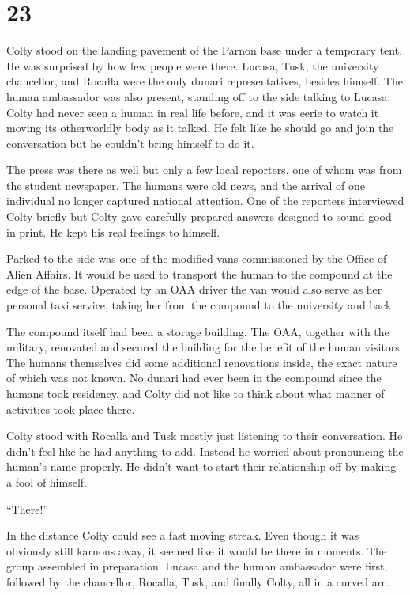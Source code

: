
\chapter{23}

Colty stood on the landing pavement of the Parnon base under a temporary tent. He was surprised
by how few people were there. Lucasa, Tusk, the university chancellor, and Rocalla were the only
dunari representatives, besides himself. The human ambassador was also present, standing off to
the side talking to Lucasa. Colty had never seen a human in real life before, and it was eerie
to watch it moving its otherworldly body as it talked. He felt like he should go and join the
conversation but he couldn't bring himself to do it.

The press was there as well but only a few local reporters, one of whom was from the student
newspaper. The humans were old news, and the arrival of one individual no longer captured
national attention. One of the reporters interviewed Colty briefly but Colty gave carefully
prepared answers designed to sound good in print. He kept his real feelings to himself.

Parked to the side was one of the modified vans commissioned by the Office of Alien Affairs. It
would be used to transport the human to the compound at the edge of the base. Operated by an OAA
driver the van would also serve as her personal taxi service, taking her from the compound to
the university and back.

The compound itself had been a storage building. The OAA, together with the military, renovated
and secured the building for the benefit of the human visitors. The humans themselves did some
additional renovations inside, the exact nature of which was not known. No dunari had ever been
in the compound since the humans took residency, and Colty did not like to think about what
manner of activities took place there.

Colty stood with Rocalla and Tusk mostly just listening to their conversation. He didn't feel
like he had anything to add. Instead he worried about pronouncing the human's name properly. He
didn't want to start their relationship off by making a fool of himself.

``There!''

In the distance Colty could see a fast moving streak. Even though it was obviously still karnons
away, it seemed like it would be there in moments. The group assembled in preparation. Lucasa
and the human ambassador were first, followed by the chancellor, Rocalla, Tusk, and finally
Colty, all in a curved arc.

